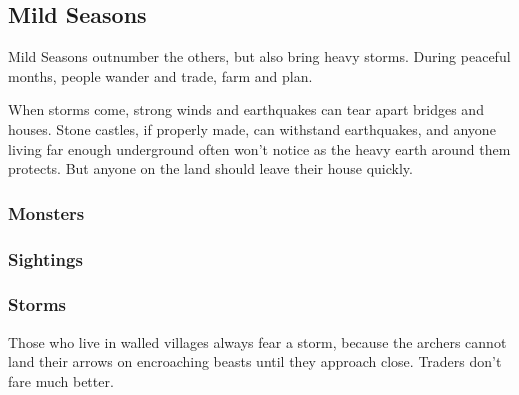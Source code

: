 \begin{multicols}{2}

\subsection{Mild Seasons}

Mild Seasons outnumber the others, but also bring heavy storms.
During peaceful months, people wander and trade, farm and plan.

When storms come, strong winds and earthquakes can tear apart bridges and houses.
Stone castles, if properly made, can withstand earthquakes, and anyone living far enough underground often won't notice as the heavy earth around them protects.
But anyone on the land should leave their house quickly.

\encMildVillages

\encMildEdge

\encMildForest

\begin{multicols}{2}
\subsubsection*{Monsters}
\label{monsterEncounters}

\setcounter{enc}{3}
\begin{dlist}
\end{dlist}

\subsubsection*{Sightings}

\setcounter{track}{2}
\begin{dlist}
\end{dlist}

\end{multicols}

\subsubsection{Storms}
Those who live in walled villages always fear a storm, because the archers cannot land their arrows on encroaching beasts until they approach close.
Traders don't fare much better.

\end{multicols}

